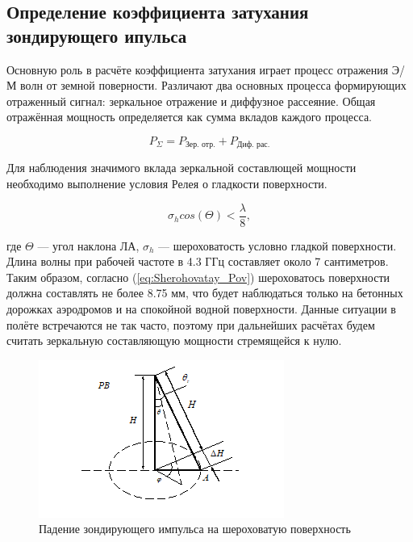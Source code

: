 \documentclass[utf8x, 14pt, oneside, a4paper]{article}
\begin{document}
		\subsection{Определение коэффициента затухания зондирующего ипульса}
			Основную роль в расчёте коэффициента затухания играет процесс отражения Э/М волн от земной поверности. Различают два основных процесса формирующих отраженный сигнал: зеркальное отражение и диффузное рассеяние. Общая отражённая мощность определяется как сумма вкладов каждого процесса.
			
			\begin{equation}
				P_{\Sigma}=P_{\text{Зер. отр.}}+P_{\text{Диф. рас.}}
			\end{equation}
		
			Для наблюдения значимого вклада зеркальной составлющей мощности необходимо выполнение условия Релея о гладкости поверхности.
			
			\begin{equation}
				\label{eq:Sherohovatay_Pov}
				\sigma_{h}cos(\Theta)<\frac{\lambda}{8},
			\end{equation}
		
			где $\Theta$ --- угол наклона ЛА, $\sigma_{h}$ --- шероховатость условно гладкой поверхности. Длина волны при рабочей частоте в 4.3 ГГц составляет около 7 сантиметров. Таким образом, согласно (\ref{eq:Sherohovatay_Pov}) шероховатось поверхности должна составлять не более 8.75 мм, что будет наблюдаться только на бетонных дорожках аэродромов и на спокойной водной поверхности. Данные ситуации в полёте встречаются не так часто, поэтому при дальнейших расчётах будем считать зеркальную составляющую мощности стремящейся к нулю.
			
			\begin{figure}[H]
				\centering
				\includegraphics[width=0.7\linewidth]{"Рисунки/Эффективная площадь шероховатой поверхности"}
				\caption{Падение зондирующего импульса на шероховатую поверхность}
				\label{fig:EPR_Diff_Ras}
			\end{figure}
			
\end{document}
